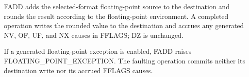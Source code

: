 FADD adds the selected-format floating-point source to the destination and
rounds the result according to the floating-point environment. A completed
operation writes the rounded value to the destination and accrues any generated
NV, OF, UF, and NX causes in FFLAGS; DZ is unchanged.

If a generated floating-point exception is enabled, FADD raises
FLOATING\_POINT\_EXCEPTION. The faulting operation commits neither its destination
write nor its accrued FFLAGS causes.
